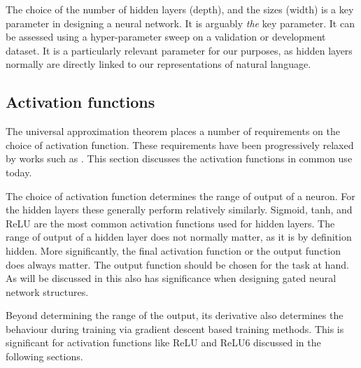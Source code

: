 \documentclass[12pt,parskip]{komatufte}
\begin{document}
The choice of the number of hidden layers (depth),
and the sizes (width) is a key parameter in designing a neural network.
It is arguably \emph{the} key parameter.
It can be assessed using a hyper-parameter sweep on a validation or development dataset.
It is a particularly relevant parameter for our purposes, as hidden layers normally are directly linked to our representations of natural language.



\subsection{Activation functions}



The universal approximation theorem places a number of requirements on the choice of activation function.
These requirements have been progressively relaxed by works such as \textcite{leshno1993uat, SONODA2017uat}.
This section discusses the activation functions in common use today.

The choice of activation function determines the range of output of a neuron.
For the hidden layers these generally perform relatively similarly.
Sigmoid, tanh, and ReLU are the most common activation functions used for hidden layers.
The range of output of a hidden layer does not normally matter, as it is by definition hidden.
More significantly, the final activation function or the output function does always matter.
The output function should be chosen for the task at hand.
As will be discussed in  this also has significance when designing gated neural network structures.



Beyond determining the range of the output, its derivative also determines the behaviour during training via gradient descent based training methods.
This is significant for activation functions like ReLU and ReLU6 discussed in the following sections.
\end{document}
